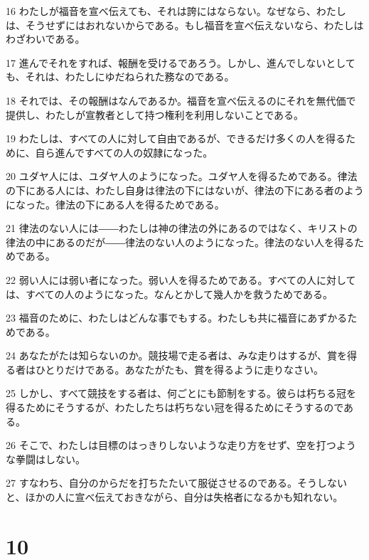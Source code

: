 \par 16 わたしが福音を宣べ伝えても、それは誇にはならない。なぜなら、わたしは、そうせずにはおれないからである。もし福音を宣べ伝えないなら、わたしはわざわいである。
\par 17 進んでそれをすれば、報酬を受けるであろう。しかし、進んでしないとしても、それは、わたしにゆだねられた務なのである。
\par 18 それでは、その報酬はなんであるか。福音を宣べ伝えるのにそれを無代価で提供し、わたしが宣教者として持つ権利を利用しないことである。
\par 19 わたしは、すべての人に対して自由であるが、できるだけ多くの人を得るために、自ら進んですべての人の奴隷になった。
\par 20 ユダヤ人には、ユダヤ人のようになった。ユダヤ人を得るためである。律法の下にある人には、わたし自身は律法の下にはないが、律法の下にある者のようになった。律法の下にある人を得るためである。
\par 21 律法のない人には――わたしは神の律法の外にあるのではなく、キリストの律法の中にあるのだが――律法のない人のようになった。律法のない人を得るためである。
\par 22 弱い人には弱い者になった。弱い人を得るためである。すべての人に対しては、すべての人のようになった。なんとかして幾人かを救うためである。
\par 23 福音のために、わたしはどんな事でもする。わたしも共に福音にあずかるためである。
\par 24 あなたがたは知らないのか。競技場で走る者は、みな走りはするが、賞を得る者はひとりだけである。あなたがたも、賞を得るように走りなさい。
\par 25 しかし、すべて競技をする者は、何ごとにも節制をする。彼らは朽ちる冠を得るためにそうするが、わたしたちは朽ちない冠を得るためにそうするのである。
\par 26 そこで、わたしは目標のはっきりしないような走り方をせず、空を打つような拳闘はしない。
\par 27 すなわち、自分のからだを打ちたたいて服従させるのである。そうしないと、ほかの人に宣べ伝えておきながら、自分は失格者になるかも知れない。

\chapter{10}

